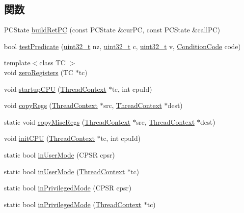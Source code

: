 \subsection*{関数}
\begin{DoxyCompactItemize}
\item 
PCState \hyperlink{namespaceArmISA_a0e2815b0803df8ce2136b60016c753e7}{buildRetPC} (const PCState \&curPC, const PCState \&callPC)
\item 
bool \hyperlink{namespaceArmISA_a848b73b2c927bdbdbbdb755e9cc46920}{testPredicate} (\hyperlink{Type_8hh_a435d1572bf3f880d55459d9805097f62}{uint32\_\-t} nz, \hyperlink{Type_8hh_a435d1572bf3f880d55459d9805097f62}{uint32\_\-t} c, \hyperlink{Type_8hh_a435d1572bf3f880d55459d9805097f62}{uint32\_\-t} v, \hyperlink{namespaceArmISA_ab8f08e777c4753720cff841f81da8e06}{ConditionCode} code)
\item 
{\footnotesize template$<$class TC $>$ }\\void \hyperlink{namespaceArmISA_afd00c2a64f1425c1fbdf9314b359f65c}{zeroRegisters} (TC $\ast$tc)
\item 
void \hyperlink{namespaceArmISA_ab6f04850c6d48b5a79fd721d012df057}{startupCPU} (\hyperlink{classThreadContext}{ThreadContext} $\ast$tc, int cpuId)
\item 
void \hyperlink{namespaceArmISA_aaeffcccf262b0dbd3cbcc8b4cef41168}{copyRegs} (\hyperlink{classThreadContext}{ThreadContext} $\ast$src, \hyperlink{classThreadContext}{ThreadContext} $\ast$dest)
\item 
static void \hyperlink{namespaceArmISA_a515eb33a0f75168399abe82a660c1de8}{copyMiscRegs} (\hyperlink{classThreadContext}{ThreadContext} $\ast$src, \hyperlink{classThreadContext}{ThreadContext} $\ast$dest)
\item 
void \hyperlink{namespaceArmISA_aded557a1e716c6f849b0e0b05fc77676}{initCPU} (\hyperlink{classThreadContext}{ThreadContext} $\ast$tc, int cpuId)
\item 
static bool \hyperlink{namespaceArmISA_a6bb93acc2115e64547dbfefaf7b56059}{inUserMode} (CPSR cpsr)
\item 
static bool \hyperlink{namespaceArmISA_a48d2a96d7eabb140175bd62f0d7aea5e}{inUserMode} (\hyperlink{classThreadContext}{ThreadContext} $\ast$tc)
\item 
static bool \hyperlink{namespaceArmISA_a7e5eb3a6661fbae4f48cefbc26acace5}{inPrivilegedMode} (CPSR cpsr)
\item 
static bool \hyperlink{namespaceArmISA_a345174a59872ced0db7dcd698b1dbed7}{inPrivilegedMode} (\hyperlink{classThreadContext}{ThreadContext} $\ast$tc)

\end{DoxyCompactItemize}
